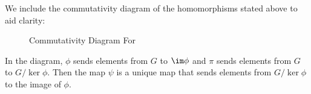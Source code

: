 \newpage

We include the commutativity diagram of the homomorphisms stated above to aid clarity:

\begin{figure}[h]
    \centering
    \caption{Commutativity Diagram For }
\end{figure}

In the diagram, $\phi$ sends elements from $G$ to $\im\phi$ and $\pi$ sends elements from $G$ to $G/\ker\phi$. Then the map $\psi$ is a unique map that sends elements from $G/\ker\phi$ to the image of $\phi$.

